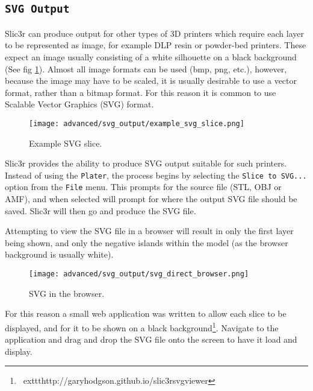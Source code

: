 
\subsection{\texttt{SVG Output}} %
\label{sec:svg_output}

Slic3r can produce output for other types of 3D printers which require each layer to be represented as image, for example DLP resin or powder-bed printers.  These expect an image usually consisting of a white silhouette on a black background (See fig \ref{fig:example_svg_slice}).  Almost all image formats can be used (bmp, png, etc.), however, because the image may have to be scaled, it is usually desirable to use a vector format, rather than a bitmap format.  For this reason it is common to use Scalable Vector Graphics (SVG) format.

\begin{figure}[H]
\centering
\texttt{[image: advanced/svg\_output/example\_svg\_slice.png]}
\caption{Example SVG slice.}
\label{fig:example_svg_slice}
\end{figure}


Slic3r provides the ability to produce SVG output suitable for such printers.  Instead of using the \texttt{Plater}, the process begins by selecting the \texttt{Slice to SVG...} option from the \texttt{File} menu.  This prompts for the source file (STL, OBJ or AMF), and when selected will prompt for where the output SVG file should be saved.  Slic3r will then go and produce the SVG file.

Attempting to view the SVG file in a browser will result in only the first layer being shown, and only the negative islands within the model (as the browser background is usually white).

\begin{figure}[H]
\centering
\texttt{[image: advanced/svg\_output/svg\_direct\_browser.png]}
\caption{SVG in the browser.}
\label{fig:svg_direct_browser}
\end{figure}

For this reason a small web application was written to allow each slice to be displayed, and for it to be shown on a black background\footnote{\	exttt{http://garyhodgson.github.io/slic3rsvgviewer}}.  Navigate to the application and drag and drop the SVG file onto the screen to have it load and display.


